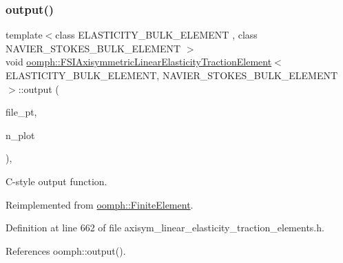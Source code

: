 \subsubsection{\texorpdfstring{output()}{output()}\hspace{0.1cm}{\footnotesize\ttfamily [4/4]}}
{\footnotesize\ttfamily template$<$class E\+L\+A\+S\+T\+I\+C\+I\+T\+Y\+\_\+\+B\+U\+L\+K\+\_\+\+E\+L\+E\+M\+E\+NT , class N\+A\+V\+I\+E\+R\+\_\+\+S\+T\+O\+K\+E\+S\+\_\+\+B\+U\+L\+K\+\_\+\+E\+L\+E\+M\+E\+NT $>$ \\
void \hyperlink{classoomph_1_1FSIAxisymmetricLinearElasticityTractionElement}{oomph\+::\+F\+S\+I\+Axisymmetric\+Linear\+Elasticity\+Traction\+Element}$<$ E\+L\+A\+S\+T\+I\+C\+I\+T\+Y\+\_\+\+B\+U\+L\+K\+\_\+\+E\+L\+E\+M\+E\+NT, N\+A\+V\+I\+E\+R\+\_\+\+S\+T\+O\+K\+E\+S\+\_\+\+B\+U\+L\+K\+\_\+\+E\+L\+E\+M\+E\+NT $>$\+::output (\begin{DoxyParamCaption}\item[{F\+I\+LE $\ast$}]{file\+\_\+pt,  }\item[{const unsigned \&}]{n\+\_\+plot }\end{DoxyParamCaption})\hspace{0.3cm}{\ttfamily [inline]}, {\ttfamily [virtual]}}



C-\/style output function. 



Reimplemented from \hyperlink{classoomph_1_1FiniteElement_adfaee690bb0608f03320eeb9d110d48c}{oomph\+::\+Finite\+Element}.



Definition at line 662 of file axisym\+\_\+linear\+\_\+elasticity\+\_\+traction\+\_\+elements.\+h.



References oomph\+::output().

\mbox{\label{classoomph_1_1FSIAxisymmetricLinearElasticityTractionElement_a7f934810722cf9109bfec4c063671ce5}} 
